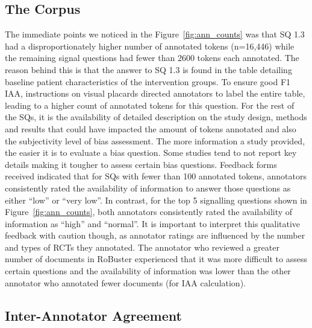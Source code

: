 \documentclass[sn-mathphys,Numbered]{sn-jnl}%
\theoremstyle{thmstyleone}%
\theoremstyle{thmstyletwo}%
\theoremstyle{thmstylethree}%
\begin{document}
%
%
%
\subsection{The Corpus}
\label{disc:corpus}
%
The immediate points we noticed in the Figure~\ref{fig:ann_counts} was that SQ 1.3 had a disproportionately higher number of annotated tokens (n=16,446) while the remaining signal questions had fewer than 2600 tokens each annotated.
The reason behind this is that the answer to SQ 1.3 is found in the table detailing baseline patient characteristics of the intervention groups.
To ensure good F1 IAA, instructions on visual placards directed annotators to label the entire table, leading to a higher count of annotated tokens for this question.
For the rest of the SQs, it is the availability of detailed description on the study design, methods and results that could have impacted the amount of tokens annotated and also the subjectivity level of bias assessment.
The more information a study provided, the easier it is to evaluate a bias question.
Some studies tend to not report key details making it tougher to assess certain bias questions.
Feedback forms received indicated that for SQs with fewer than 100 annotated tokens, annotators consistently rated the availability of information to answer those questions as either ``low'' or ``very low''.
In contrast, for the top 5 signalling questions shown in Figure~\ref{fig:ann_counts}, both annotators consistently rated the availability of information as ``high'' and ``normal''.
It is important to interpret this qualitative feedback with caution though, as annotator ratings are influenced by the number and types of RCTs they annotated.
The annotator who reviewed a greater number of documents in RoBuster experienced that it was more difficult to assess certain questions and the availability of information was lower than the other annotator who annotated fewer documents (for IAA calculation).
%
%
%
\subsection{Inter-Annotator Agreement}
\label{disc:iaa}
%
\end{document}
